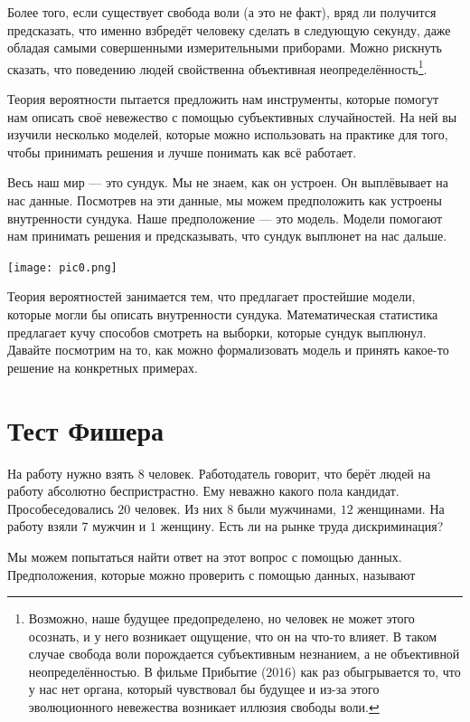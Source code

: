\documentclass[12pt, a4paper, oneside]{article}
\begin{document}
Более того, если существует свобода воли (а это не факт), вряд ли получится предсказать, что именно взбредёт человеку сделать в следующую секунду, даже обладая самыми совершенными измерительными приборами. Можно рискнуть сказать, что поведению людей свойственна объективная неопределённость\footnote{Возможно, наше будущее предопределено, но человек не может этого осознать, и у него возникает ощущение, что он на что-то влияет. В таком случае свобода воли порождается субъективным незнанием, а не объективной неопределённостью. В фильме Прибытие (2016) как раз обыгрывается то, что у нас нет органа, который чувствовал бы будущее и из-за этого эволюционного невежества возникает иллюзия свободы воли.}.

Теория вероятности пытается предложить нам инструменты, которые помогут нам описать своё невежество с помощью субъективных случайностей. На ней вы изучили несколько моделей, которые можно использовать на практике для того, чтобы принимать решения и лучше понимать как всё работает. 

Весь наш мир --- это сундук. Мы не знаем, как он устроен. Он выплёвывает на нас данные. Посмотрев на эти данные, мы можем предположить как устроены внутренности сундука. Наше предположение --- это модель. Модели помогают нам принимать решения и предсказывать, что сундук выплюнет на нас дальше.

\begin{center} 
\texttt{[image: pic0.png]}
\end{center} 

Теория вероятностей занимается тем, что предлагает простейшие модели, которые могли бы описать внутренности сундука. Математическая статистика предлагает кучу способов смотреть на выборки, которые сундук выплюнул. Давайте посмотрим на то, как можно формализовать модель и принять какое-то решение на конкретных примерах. 

\section{Тест Фишера}

На работу нужно взять $8$ человек. Работодатель говорит, что берёт людей на работу абсолютно беспристрастно. Ему неважно какого пола кандидат. Прособеседовались $20$ человек. Из них $8$ были мужчинами, $12$ женщинами. На работу взяли $7$ мужчин и $1$ женщину. Есть ли на рынке труда дискриминация?  

Мы можем попытаться найти ответ на этот вопрос с помощью данных. Предположения, которые можно проверить с помощью данных, называют  
\end{document}
